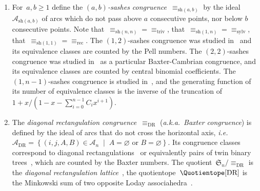 \documentclass{amsart}
\theoremstyle{definition}
\newcommand{\f}[1]{{\mathfrak{#1}}} %
\newcommand{\set}[2]{\left\{ #1 \;\middle|\; #2 \right\}} %
\newcommand{\ie}{\textit{i.e.}~} %
\newcommand{\aka}{\textit{a.k.a.}~} %
\newcommand{\darkblue}{\color{darkblue}} %
\newcommand{\defn}[1]{\textsl{\darkblue #1}} %
\newcommand{\arcs}{{\mathcal{A}}} %
\begin{document}
\begin{enumerate}
\item \label{item:abSashesCongruence}
For~$a, b \ge 1$ define the \defn{$(a,b)$-sashes congruence}~$\equiv_{\textrm{sh}(a,b)}$ by the ideal~$\arcs_{\textrm{sh}(a,b)}$ of arcs which do not pass above $a$ consecutive points, nor below $b$ consecutive points.
Note that~${\equiv_{\textrm{sh}(n,n)}} = {\equiv_{\textrm{triv}}}$, that~${\equiv_{\textrm{sh}(1,n)}} = {\equiv_{\textrm{sylv}}}$, that~${\equiv_{\textrm{sh}(1,1)}} = {\equiv_{\textrm{rec}}}$.
The $(1,2)$-sashes congruence was studied in~\cite{Law} and its equivalence classes are counted by the Pell numbers.
The $(2,2)$-sashes congruence was studied in~\cite{ChatelPilaud} as a particular Baxter-Cambrian congruence, and its equivalence classes are counted by central binomial coefficients.
The~$(1,n-1)$-sashes congruence is studied in~\cite{LaniniNovelli}, and the generating function of its number of equivalence classes is the inverse of the truncation of~$1 + x/(1-x-\sum_{i=0}^{n-1} C_i x^{i+1})$.


\item \label{item:BaxterCongruence}
The \defn{diagonal rectangulation congruence}~$\equiv_\textrm{DR}$ (\aka \defn{Baxter congruence}) is defined by the ideal of arcs that do not cross the horizontal axis, \ie~$\arcs_\textrm{DR} = \set{(i, j, A, B) \in \arcs_n}{A = \varnothing \text{ or } B = \varnothing}$.
Its congruence classes correspond to diagonal rectangulations~\cite{LawReading} or equivalently pairs of twin binary trees~\cite{Giraudo}, which are counted by the Baxter numbers.
The quotient~$\f{S}_n / {\equiv_\textrm{DR}}$ is the \defn{diagonal rectangulation lattice}~\cite{LawReading}, the quotientope~$\Quotientope[\textrm{DR}]$ is the Minkowski sum of two opposite Loday associahedra~\cite{LawReading,CardinalPilaud}.


\end{enumerate}
\end{document}
